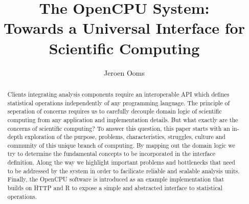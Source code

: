 \documentclass{article}
\author{Jeroen Ooms}
\title{The OpenCPU System:\\ Towards a Universal Interface for Scientific Computing}
\begin{document}
\maketitle

\begin{abstract}
Clients integrating analysis components require an interoperable API which defines statistical operations independently of any programming language. The principle of seperation of concerns requires us to carefully decouple domain logic of scientific computing from any application and implementation details. But what exactly are the concerns of scientific computing? To answer this question, this paper starts with an in-depth exploration of the purpose, problems, characteristics, struggles, culture and community of this unique branch of computing. By mapping out the domain logic we try to determine the fundamental concepts to be incorporated in the interface definition. Along the way we highlight important problems and bottlenecks that need to be addressed by the system in order to facilicate reliable and scalable analysis units. Finally, the OpenCPU software is introduced as an example implementation that builds on HTTP and R to expose a simple and abstracted interface to statistical operations.
\end{abstract}







 






\end{document}
